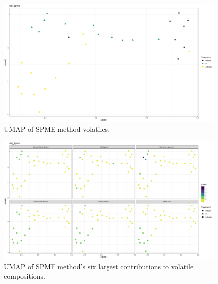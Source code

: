 \documentclass[12pt,final,CPage]{ufthesis}
\begin{document}
{\begin{figure}
  {\centering \includegraphics[width=1\linewidth]{figure/rrv_volatiles_umap_rrd_spme} 

  }

  \caption[UMAP of SPME method volatiles]{UMAP of SPME method volatiles.}\label{fig:spme-vocs-umap}
  \end{figure}
  \begin{figure}

  {\centering \includegraphics[width=1\linewidth]{figure/rrv_volatiles_umap_chems_rrd_spme} 

  }

  \caption[UMAP of SPME method's six largest contributions to volatile compositions]{UMAP of SPME method's six largest contributions to volatile compositions.}\label{fig:spme-vocs-umap-chems}
  \end{figure}
  \begin{table}


\end{table}}
\end{document}
